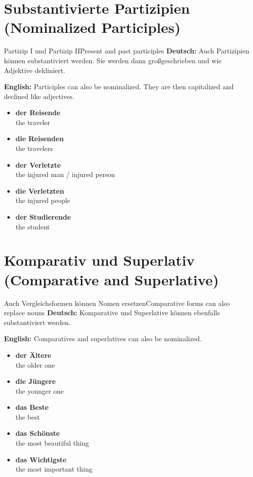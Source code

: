 \documentclass[a4paper,11pt]{article}
\newcommand{\GermanText}[1]{\textbf{Deutsch: }#1\par}
\newcommand{\EnglishText}[1]{{\small\color{SoftGray}\textbf{English: }#1\par}}
\newcommand{\ExampleItem}[2]{\item \textbf{#1}\\{\small\color{SoftGray}#2}}
\begin{document}
\section{Substantivierte Partizipien \textnormal{(Nominalized Participles)}}
\begin{grammarentry}{Partizip I und Partizip II}{Present and past participles}
\GermanText{Auch Partizipien können substantiviert werden. Sie werden dann großgeschrieben und wie Adjektive dekliniert.}
\EnglishText{Participles can also be nominalized. They are then capitalized and declined like adjectives.}
\end{grammarentry}
\begin{exbox}
\begin{itemize}
\ExampleItem{der \textbf{Reisende}}{the traveler}
\ExampleItem{die \textbf{Reisenden}}{the travelers}
\ExampleItem{der \textbf{Verletzte}}{the injured man / injured person}
\ExampleItem{die \textbf{Verletzten}}{the injured people}
\ExampleItem{der \textbf{Studierende}}{the student}
\end{itemize}
\end{exbox}

\section{Komparativ und Superlativ \textnormal{(Comparative and Superlative)}}
\begin{grammarentry}{Auch Vergleichsformen können Nomen ersetzen}{Comparative forms can also replace nouns}
\GermanText{Komparative und Superlative können ebenfalls substantiviert werden.}
\EnglishText{Comparatives and superlatives can also be nominalized.}
\end{grammarentry}
\begin{exbox}
\begin{itemize}
\ExampleItem{der \textbf{Ältere}}{the older one}
\ExampleItem{die \textbf{Jüngere}}{the younger one}
\ExampleItem{das \textbf{Beste}}{the best}
\ExampleItem{das \textbf{Schönste}}{the most beautiful thing}
\ExampleItem{das \textbf{Wichtigste}}{the most important thing}
\end{itemize}
\end{exbox}
\end{document}
